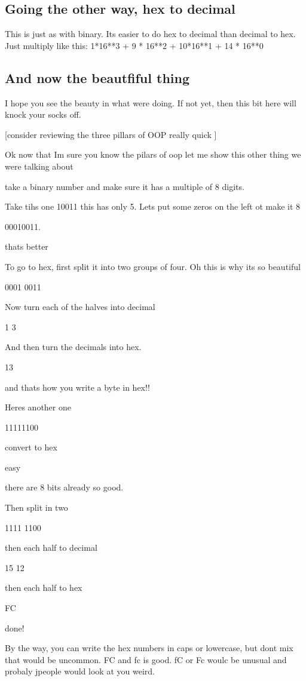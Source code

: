 \documentclass[10pt]{article}
\begin{document}
\subsection{Going the other way, hex to decimal}
This is just as with binary. Its easier to do hex to decimal than decimal to
hex. Just multiply like this: 1*16**3 + 9 * 16**2 + 10*16**1 + 14 * 16**0

\subsection{And now the beautfiful thing}
I hope you see the beauty in what were doing. If not yet, then this bit here
will knock your socks off.

[consider reviewing the three pillars of OOP really quick ]

Ok now that Im sure you know the pilars of oop let me show this other thing we
were talking about


take a binary number and make sure it has a multiple of 8 digits. 

Take tihs one 10011 this has only 5. Lets put some zeros on the left ot make it
8

00010011. 

thats better

To go to hex, first split it into two groups of four. Oh this is why its so
beautiful

0001    0011


Now turn each of the halves into decimal


1       3

And then turn the decimals into hex.

13

and thats how you write a byte in hex!!

Heres another one

11111100

convert to hex

easy

there are 8 bits already so good.

Then split in two

1111 1100


then each half to decimal

15   12


then each half to hex

FC


done!

By the way, you can write the hex numbers in caps or lowercase, but dont mix
that would be uncommon. FC and fc is good. fC or Fc woulc be unusual and probaly
jpeople would look at you weird.
\end{document}
